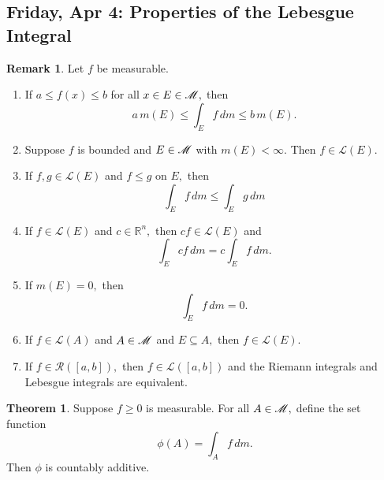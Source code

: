 \documentclass[10pt, oneside]{article}
\newcommand{\bbR}{\mathbb{R}}
\theoremstyle{definition}
\newtheorem{thm}{Theorem}
\newtheorem{rem}{Remark}
\begin{document}
\subsection{Friday, Apr 4: Properties of the Lebesgue Integral}
\begin{rem}
Let $f$ be measurable.
\begin{enumerate}
    \item If $a\leq f(x) \leq b$ for all $x\in E \in \cal M,$ then 
    \[a \,m(E) \leq \int_E f\, dm \leq b\,m(E).\]
    \item Suppose $f$ is bounded and $E \in \cal M$ with $m(E) < \infty.$ Then $f\in \mathcal L(E).$
    \item If $f,g \in \mathcal L(E)$ and $f \leq g$ on $E,$ then 
    \[\int_E f\, dm \leq \int_E g\,dm\]
    \item If $f \in \mathcal L(E)$ and $c\in \bbR^n,$ then $cf \in \mathcal{L}(E)$ and 
    \[\int_E c f\,dm = c\int_E f \, dm.\]
    \item If $m(E) = 0,$ then 
    \[\int_E f\, dm = 0.\]
    \item If $f\in \mathcal L(A)$ and $A \in \cal M$ and $E\subseteq A,$ then $f\in \mathcal L(E).$
    \item If $f\in \mathcal{R}([a,b]),$ then $f \in \mathcal{L}([a,b])$ and the Riemann integrals and Lebesgue integrals are equivalent. 
\end{enumerate}
\end{rem}
\begin{thm}
    Suppose $f\geq 0$ is measurable. For all $A\in \cal M,$ define the set function 
    \[\phi(A) = \int_A f\, dm.\] Then $\phi$ is countably additive.
\end{thm}
\end{document}
